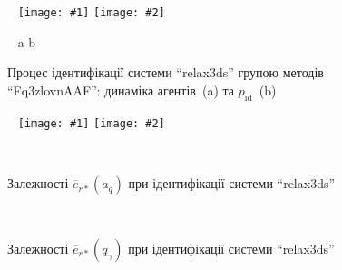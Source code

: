 \documentclass[14pt,handout,utf8]{beamer}
\newlength\DDP
\newcommand{\Xhead}[1]{
 \begin{center}%
      \textbf{#1}%
 \end{center}%
}
\newcommand{\ABlbl}{%
  \vspace{-2.7ex}
  \begin{center}
    ~ \hfill a \hfill\hfill b \hfill ~
  \end{center}
  \vspace{-2.0ex}
}
\newcommand{\PicDouble}[2]{%
 \begin{center}
    ~ \hfill
    \texttt{[image: \#1]}
    \hfill
    \texttt{[image: \#2]}
    \hfill ~
  \end{center}
  \ABlbl
}
\newcommand{\PicDoubleNL}[2]{%
 \begin{center}
    ~ \hfill
    \texttt{[image: \#1]}
    \hfill
    \texttt{[image: \#2]}
    \hfill ~
  \end{center}
}
\newcommand{\TextDouble}[2]{%
 \begin{center}
    ~ \hfill
    \parbox[t]{\DDP}{#1}
    \hfill
    \parbox[t]{\DDP}{#2}
    \hfill ~
  \end{center}
}
\begin{document}
\begin{frame}
  \frametitle{~}

  \Xhead{}

  \begin{figure}
    \PicDouble{../p7/p/relax3ds_read_id2_0-p_p.png}{../p7/p/relax3ds_read_id2_0-p_pp.png}
    \caption{Процес ідентифікації системи ``relax3ds'' групою методів ``Fq3zlovnAAF'': динаміка агентів~(a) та $p_\mathrm{id}$~(b)}
  \end{figure}

  \begin{figure}
    \PicDoubleNL{../p7/p/relax3ds_read_id2_prm_0-p_a_q.png}{../p7/p/relax3ds_read_id2_prm_0-p_q_gamma.png}
    \TextDouble{\caption{Залежності $\overline{e}_{r *}(a_q)$ при ідентифікації системи ``relax3ds''}}{\caption{Залежності $ \overline{e}_{r *} (q_\gamma) $ при ідентифікації системи ``relax3ds''}}
  \end{figure}


\end{frame}

\end{document}
